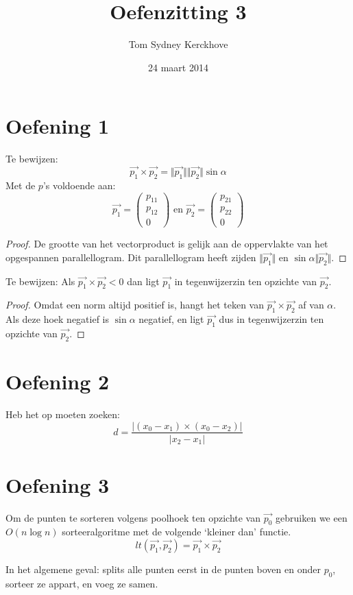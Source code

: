 \documentclass[10pt,a4paper]{article}
\title{Oefenzitting 3}
\author{Tom Sydney Kerckhove}
\date{24 maart 2014}
\begin{document}
\maketitle


\section*{Oefening 1}
Te bewijzen:
\[
\vec{p_1}\times\vec{p_2}
= \Vert\vec{p_1}\Vert\Vert\vec{p_2}\Vert\sin\alpha
\]
Met de $p$'s voldoende aan:
\[
\vec{p_1} = \begin{pmatrix}
p_{11}\\p_{12}\\0
\end{pmatrix}
\text{ en }
\vec{p_2} = \begin{pmatrix}
p_{21}\\p_{22}\\0
\end{pmatrix}
\]

\begin{proof}
De grootte van het vectorproduct is gelijk aan de oppervlakte van het opgespannen parallellogram. Dit parallellogram heeft zijden $\Vert \vec{p_1}\Vert$ en $\sin\alpha\Vert \vec{p_2}\Vert$.
\end{proof}


\noindent Te bewijzen: Als $\vec{p_1}\times\vec{p_2} <0$  dan ligt $\vec{p_1}$ in tegenwijzerzin ten opzichte van $\vec{p_2}$.
\begin{proof}
Omdat een norm altijd positief is, hangt het teken van $\vec{p_1}\times\vec{p_2}$ af van $\alpha$. Als deze hoek negatief is $\sin\alpha$ negatief, en ligt $\vec{p_1}$ dus in tegenwijzerzin ten opzichte van $\vec{p_2}$.
\end{proof}

\section*{Oefening 2}
Heb het op moeten zoeken:
\[
d = \frac{|(x_0-x_1)\times(x_0-x_2)|}{|x_2-x_1|}
\]

\section*{Oefening 3}
Om de punten te sorteren volgens poolhoek ten opzichte van $\vec{p_0}$ gebruiken we een $O(n\log n)$ sorteeralgoritme met de volgende `kleiner dan' functie.
\[
lt(\vec{p_1},\vec{p_2}) = \vec{p_1}\times\vec{p_2}
\]

In het algemene geval: splits alle punten eerst in de punten boven en onder $p_0$, sorteer ze appart, en voeg ze samen.
\end{document}
